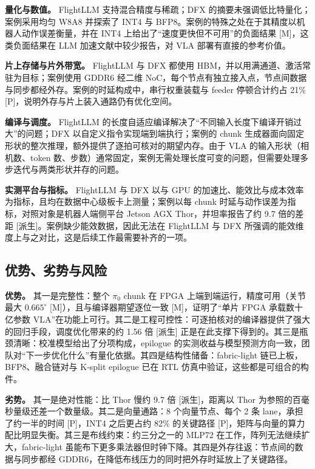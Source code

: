 \documentclass[a4paper,10.5pt]{ctexart}
\newcommand{\tM}{\textsf{[M]}}              %
\newcommand{\tP}{\textsf{[P]}}              %
\newcommand{\tD}{\textsf{[派生]}}           %
\newcommand{\pizero}{$\pi_0$}
\begin{document}
\textbf{量化与数值。} FlightLLM 支持混合精度与稀疏；DFX 的摘要未强调低比特量化；案例采用均匀 W8A8 并探索了 INT4 与 BFP8。案例的特殊之处在于其精度以机器人动作误差衡量，并在 INT4 上给出了“速度更快但不可用”的负面结果 \tM，这类负面结果在 LLM 加速文献中较少报告，对 VLA 部署有直接的参考价值。

\textbf{片上存储与片外带宽。} FlightLLM 与 DFX 都使用 HBM，并以用满通道、激活常驻为目标；案例使用 GDDR6 经二维 NoC，每个节点有独立接入点，节点间数据与同步都经外存。案例的时延构成中，串行权重装载与 feeder 停顿合计约占 21\% \tP，说明外存与片上装入通路仍有优化空间。

\textbf{编译与调度。} FlightLLM 的长度自适应编译解决了“不同输入长度下编译开销过大”的问题；DFX 以自定义指令实现端到端执行；案例的 chunk 生成器面向固定形状的整次推理，额外提供了逐拍可核对的期望内存。由于 VLA 的输入形状（相机数、token 数、步数）通常固定，案例无需处理长度可变的问题，但需要处理多步迭代与两类形状并存的问题。

\textbf{实测平台与指标。} FlightLLM 与 DFX 以与 GPU 的加速比、能效比与成本效率为指标，且均在数据中心级板卡上测量；案例以每 chunk 时延与动作误差为指标，对照对象是机器人端侧平台 Jetson AGX Thor，并坦率报告了约 9.7 倍的差距 \tD。案例缺少能效数据，因此无法在 FlightLLM 与 DFX 所强调的能效维度上与之对比，这是后续工作最需要补齐的一项。

\subsection{优势、劣势与风险}

\textbf{优势。} 其一是完整性：整个 \pizero{} chunk 在 FPGA 上端到端运行，精度可用（关节最大 $0.665^\circ$ \tM），且与编译器期望逐位一致 \tM，证明了“单片 FPGA 承载数十亿参数 VLA”在功能上可行。其二是工程可控性：可逐拍核对的编译器提供了强大的回归手段，调度优化带来的约 1.56 倍 \tD{} 正是在此支撑下得到的。其三是瓶颈清晰：校准模型给出了分项构成，epilogue 的实测收益与模型预测方向一致，团队对“下一步优化什么”有量化依据。其四是结构性储备：fabric-light 链已上板，BFP8、融合链对与 K-split epilogue 已在 RTL 仿真中验证，这些都是可组合的构件。

\textbf{劣势。} 其一是绝对性能：比 Thor 慢约 9.7 倍 \tD，距离以 Thor 为参照的百毫秒量级还差一个数量级。其二是向量通路：8 个向量节点、每个 2 条 lane，承担了约一半的时间 \tP，INT4 之后更占约 82\% 的关键路径 \tP，矩阵与向量的算力配比明显失衡。其三是布线约束：约三分之一的 MLP72 在工作，阵列无法继续扩大，fabric-light 虽能布下更多乘法器但时钟下降。其四是外存往返：节点间的数据与同步都经 GDDR6，在降低布线压力的同时把外存时延放上了关键路径。
\end{document}
